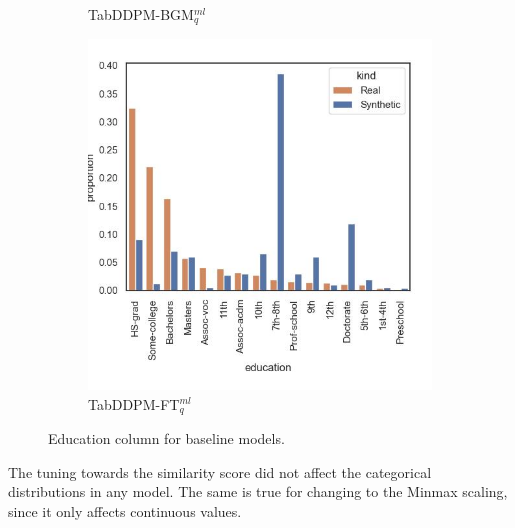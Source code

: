 \begin{figure}[h]
\begin{subfigure}{0.23\textwidth}
		\caption{TabDDPM-BGM$^{ml}_q$}
	\end{subfigure}
	\begin{subfigure}{0.23\textwidth}
		\centering
		\includegraphics[width=\textwidth]{images/dist_education/tab-ddpm-ft.jpg}
		\caption{TabDDPM-FT$^{ml}_q$}
	\end{subfigure}
	\caption{Education column for baseline models.}
	\label{fig:education}
\end{figure}

The tuning towards the similarity score did not affect the categorical distributions in any model.
The same is true for changing to the Minmax scaling, since it only affects continuous values.


